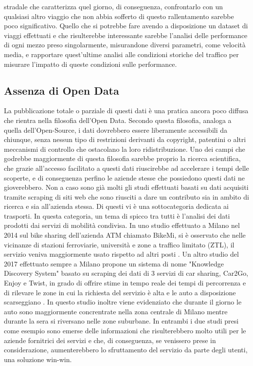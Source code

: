 stradale che caratterizza quel giorno, di conseguenza, confrontarlo con un qualsiasi altro viaggio che non abbia sofferto di questo rallentamento sarebbe poco significativo. Quello che si potrebbe fare avendo a disposizione un dataset di viaggi effettuati e che risulterebbe interessante sarebbe l'analisi delle performance di ogni mezzo preso singolarmente, misurandone diversi parametri, come velocità media, e rapportare quest'ultime analisi alle condizioni storiche del traffico per misurare l'impatto di queste condizioni sulle performance.

\subsection{Assenza di Open Data}

La pubblicazione totale o parziale di questi dati è una pratica ancora poco diffusa che rientra nella filosofia dell'Open Data. Secondo questa filosofia, analoga a quella dell'Open-Source, i dati dovrebbero essere liberamente accessibili da chiunque, senza nessun tipo di restrizioni derivanti da copyright, patentini o altri meccanismi di controllo che ostacolano la loro ridistribuzione. Uno dei campi che godrebbe maggiormente di questa filosofia sarebbe proprio la ricerca scientifica, che grazie all'accesso facilitato a questi dati riuscirebbe ad accelerare i tempi delle scoperte, e di conseguenza perfino le aziende stesse che possiedono questi dati ne gioverebbero. Non a caso sono già molti gli studi effettuati basati su dati acquisiti tramite scraping di siti web che sono riusciti a dare un contributo sia in ambito di ricerca e sia all'azienda stessa. Di questi vi è una sottocategoria dedicata ai trasporti. In questa categoria, un tema di spicco tra tutti è l'analisi dei dati prodotti dai servizi di mobilità condivisa. In uno studio effettuato a Milano nel 2014 sul bike sharing dell'azienda ATM chiamato BikeMi, si è osservato che nelle vicinanze di stazioni ferroviarie, università e zone a traffico limitato (ZTL), il servizio veniva maggiormente usato rispetto ad altri posti \cite{croci2014optimizing}. Un altro studio del 2017 effettuato sempre a Milano propone un sistema di nome "Knowledge Discovery System" basato su scraping dei dati di 3 servizi di car sharing, Car2Go, Enjoy e Twist, in grado di offrire stime in tempo reale dei tempi di percorrenza e di rilevare le zone in cui la richiesta del servizio è alta e le auto a disposizione scarseggiano \cite{pagani2017knowledge}. In questo studio inoltre viene evidenziato che durante il giorno le auto sono maggiormente concrentrate nella zona centrale di Milano mentre durante la sera si riversano nelle zone suburbane. In entrambi i due studi presi come esempio sono emerse delle informazioni che risulterebbero molto utili per le aziende fornitrici dei servizi e che, di conseguenza, se venissero prese in considerazione, aumenterebbero lo sfruttamento del servizio da parte degli utenti, una soluzione win-win.


